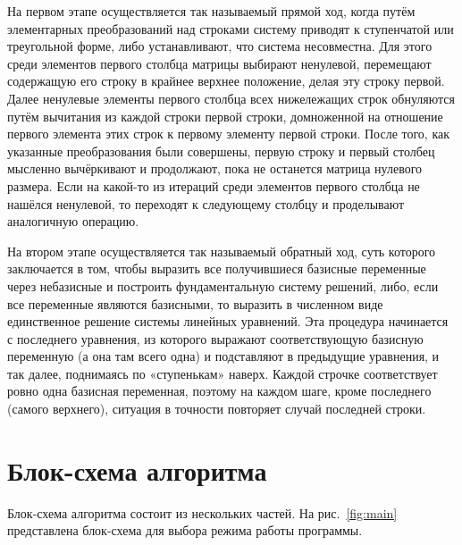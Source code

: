 \documentclass{altsu-bachelor}
\begin{document}
На первом этапе осуществляется так называемый прямой ход, когда путём элементарных преобразований над строками систему приводят к ступенчатой или треугольной форме, либо устанавливают, что система несовместна. Для этого среди элементов первого столбца матрицы выбирают ненулевой, перемещают содержащую его строку в крайнее верхнее положение, делая эту строку первой. Далее ненулевые элементы первого столбца всех нижележащих строк обнуляются путём вычитания из каждой строки первой строки, домноженной на отношение первого элемента этих строк к первому элементу первой строки. После того, как указанные преобразования были совершены, первую строку и первый столбец мысленно вычёркивают и продолжают, пока не останется матрица нулевого размера. Если на какой-то из итераций среди элементов первого столбца не нашёлся ненулевой, то переходят к следующему столбцу и проделывают аналогичную операцию.

На втором этапе осуществляется так называемый обратный ход, суть которого заключается в том, чтобы выразить все получившиеся базисные переменные через небазисные и построить фундаментальную систему решений, либо, если все переменные являются базисными, то выразить в численном виде единственное решение системы линейных уравнений. Эта процедура начинается с последнего уравнения, из которого выражают соответствующую базисную переменную (а она там всего одна) и подставляют в предыдущие уравнения, и так далее, поднимаясь по «ступенькам» наверх. Каждой строчке соответствует ровно одна базисная переменная, поэтому на каждом шаге, кроме последнего (самого верхнего), ситуация в точности повторяет случай последней строки.

\section*{Блок-схема алгоритма}

Блок-схема алгоритма состоит из нескольких частей. На рис.~\ref{fig:main} представлена блок-схема для выбора режима работы программы.
\end{document}
